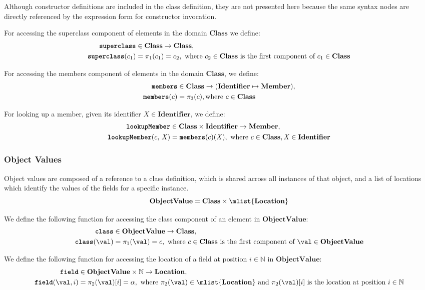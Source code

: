 \documentclass[a4paper,oneside,fleqn]{article}
\newcommand{\NN}{\mathbb{N}}    %
\newcommand{\synt}[1]{\ensuremath{\text{\textbf{\texttt{#1}}}}}
\DeclareMathOperator{\superclass}{\synt{superclass}}
\DeclareMathOperator{\members}{\synt{members}}
\DeclareMathOperator{\lookupMember}{\synt{lookupMember}}
\DeclareMathOperator{\class}{\synt{class}}
\DeclareMathOperator{\getfield}{\synt{field}}
\newcommand{\dobjval}{\mathbf{ObjectValue}}
\newcommand{\dmember}{\mathbf{Member}}
\newcommand{\dident}{\mathbf{Identifier}}
\newcommand{\idmeta}{\ensuremath{\mathit{X}}}
\newcommand{\dclass}{\mathbf{Class}}
\begin{document}
Although constructor definitions are included in the class definition, they are not presented here because the same syntax nodes are directly referenced by the expression form for constructor invocation.

For accessing the superclass component of elements in the domain $\dclass$ we define:
\begin{align*}
\superclass &\in \dclass \rightarrow \dclass,\\
\superclass(c_1) &= \pi_1(c_1) = c_2, \text{ where $c_2 \in \dclass$ is the first component of $c_1 \in \dclass$}
\end{align*}

For accessing the members component of elements in the domain $\dclass$, we define:
\begin{align*}
\members &\in \dclass \rightarrow (\dident \mapsto \dmember),\\
\members(c) &= \pi_3(c), \text{where $c \in \dclass$}
\end{align*}

For looking up a member, given its identifier $\idmeta \in \dident$, we define:
\begin{align*}
\lookupMember &\in \dclass \times \dident \rightarrow \dmember,\\
\lookupMember(c, \, \idmeta) &= \members(c)(\idmeta), \text{ where $c \in \dclass, \idmeta \in \dident$}
\end{align*}

\subsubsection{Object Values}
\label{subsec:object-values}

Object values are composed of a reference to a class definition, which is shared across all instances of that object, and a list of locations which identify the values of the fields for a specific instance.
\[
    \dobjval = \dclass \times \mlist{\dlocation}
\]

We define the following function for accessing the class component of an element in $\dobjval$:
\begin{align*}
\class &\in \dobjval \rightarrow \dclass,\\
\class(\val) &= \pi_1(\val) = c, \text{ where $c \in \dclass$ is the first component of $\val \in \dobjval$}
\end{align*}


We define the following function for accessing the location of a field at position $i \in \NN$ in $\dobjval$:
\begin{align*}
\getfield &\in \dobjval \times \NN \rightarrow \dlocation,\\
\getfield(\val, i) &= \pi_2(\val)[i] = \loc, \text{ where $\pi_2(\val) \in \mlist{\dlocation}$ and $\pi_2(\val)[i]$ is the location at position $i \in \NN$}
\end{align*}
\end{document}
